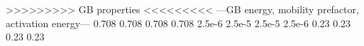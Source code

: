 >>>>>>>>> GB properties <<<<<<<<<
---GB energy, mobility prefactor, activation energy---
0.708 0.708
0.708 0.708
2.5e-6 2.5e-5
2.5e-5 2.5e-6
0.23	0.23
0.23	0.23
